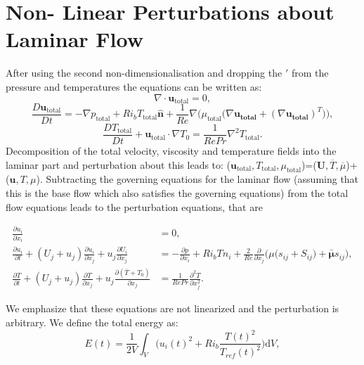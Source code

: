 \documentclass[preprint,12pt]{article}
\begin{document}
\section{Non- Linear Perturbations about Laminar Flow}
After using the second non-dimensionalisation and dropping the $'$ from the pressure and temperatures the equations can be written as:
\begin{equation}
{{\nabla}}\cdot{\mathbf{u}_\text{total}}=0,
\end{equation}
\begin{equation}
\frac{D{\mathbf{u}_\text{total}}}{D{t}}=-{\nabla} {p_\text{total}}+{Ri_bT_\text{total}} \mathbf{\hat{n}}+{\frac{1}{Re}}{\nabla}\Big({\mu_\text{total}}\big({\nabla} \mathbf{{u_\text{total}}}+({\nabla} \mathbf{{u_\text{total}}})^T\big)\Big),
\end{equation}
\begin{equation}
\frac{D{T}_\text{total}}{D{t}}+{\mathbf{u}_\text{total}}\cdot \nabla {T_0}=\frac{1}{{Re }Pr} \nabla^2{T}_\text{total}.
\end{equation}
Decomposition of the total velocity, viscosity and temperature fields into the laminar part and perturbation about this leads to:  ($\mathbf{u}_\text{total},T_\text{total},\mu_\text{total}$)=($\mathbf{U},\overline{T},\overline{\mu}$)+($\mathbf{u},{T},{\mu}$).
Subtracting the governing equations for the laminar flow (assuming that this is the base flow which also satisfies the governing equations) from the total flow equations leads to the perturbation equations, that are
\begin{tcolorbox}
\begin{align}
\frac{\partial u_i}{\partial x_i}&=0,\label{eq:Direct_incompressibility}\\
\frac{\partial{u_i}}{\partial{t}}+(U_j+u_j)\frac{\partial u_i}{\partial x_j} +u_j\frac{\partial U_i}{\partial x_j}&=-\frac{\partial p}{\partial x_i}+{Ri_bT}n_i+{\frac{2}{Re}}{\frac{\partial}{\partial x_j}}\Big({\mu}\big(s_{ij}+S_{ij}\big)+\mathbf{\bar{\mu}}s_{ij}\Big),\label{eq:Direct_momentum}\\
\frac{\partial{T}}{\partial{t}}+(U_j+u_j)\frac{\partial T}{\partial x_j} +u_j\frac{\partial(\overline{T}+T_0)}{\partial x_j}&=\frac{1}{{Re }Pr} \frac{\partial^2T}{\partial x_j^2}.\label{eq:Direct_scalar}
\end{align}
\end{tcolorbox}
We emphasize that these equations are not linearized and the perturbation is arbitrary.  We define the total energy as:
\begin{equation}
E(t)=\frac{1}{2V}\int_V \bigg(u_i(t)^2+Ri_b \frac{T(t)^2}{T_{ref}(t)^2}\bigg)\text{d}V,
\end{equation}
\end{document}
